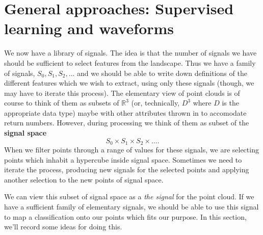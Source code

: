 \documentclass[a4paper,11pt,twoside]{article}
\theoremstyle{definition}
\theoremstyle{remark}
\begin{document}
\section{General approaches: Supervised learning and waveforms}
We now have a library of signals. The idea is that the number of signals we have should be sufficient to select features from the landscape. Thus we have a family of signals, $S_0,S_1,S_2,\dots$ and we should be able to write down definitions of the different features which we wish to extract, using only these signals (though, we may have to iterate this process). The elementary view of point clouds is of course to think of them as subsets of $\mathbb{R}^3$ (or, technically, $D^3$ where $D$ is the appropriate data type) maybe with other attributes thrown in to accomodate return numbers. However, during processing we think of them as subset of the \textbf{signal space} $$S_0\times S_1\times S_2\times\dots.$$ When we filter points through a range of values for these signals, we are selecting points which inhabit a hypercube inside signal space. Sometimes we need to iterate the process, producing new signals for the selected points and applying another selection to the new points of signal space.

We can view this subset of signal space as a \emph{the signal} for the point cloud. If we have a sufficient family of elementary signals, we should be able to use this signal to map a classification onto our points which fits our purpose. In this section, we'll record some ideas for doing this.
\end{document}
